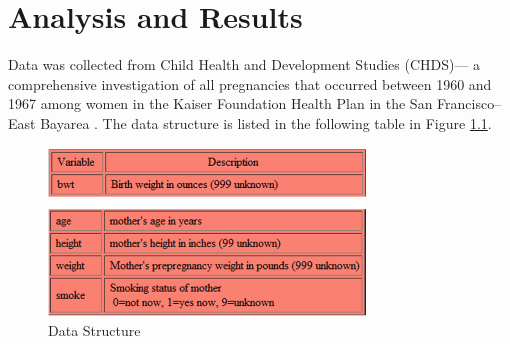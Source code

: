 \documentclass[oneside,12pt]{report}
\begin{document}
%

%
\chapter{Analysis and Results}\label{Analysis and Results}

Data was collected from Child Health and Development Studies (CHDS)--- a comprehensive investigation of all pregnancies that occurred between 1960 and 1967 among women in the Kaiser Foundation Health Plan in the San Francisco–East Bayarea \cite{Yer71}. The data structure is listed in the following table in Figure \ref{fig:ds}.\\
\begin{figure}[htb]
    \begin{center}
        \includegraphics[width=0.75\textwidth]{DATA.png}
    \end{center}
    \caption{Data Structure}
    \label{fig:ds}
\end{figure}
\end{document}
